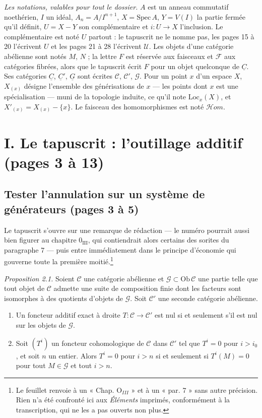 \documentclass[11pt,a4paper]{article}
\begin{document}
\emph{Les notations, valables pour tout le dossier.} $A$ est un anneau
commutatif noethérien, $I$ un idéal, $A_n = A/I^{n+1}$, $X = \mathrm{Spec}\, A$,
$Y = V(I)$ la partie fermée qu'il définit, $U = X - Y$ son complémentaire et
$i : U \to X$ l'inclusion. Le complémentaire est noté $U$ partout : le
tapuscrit ne le nomme pas, les pages 15 à 20 l'écrivent $U$ et les pages 21 à
28 l'écrivent $\mathcal{U}$. Les objets d'une catégorie abélienne sont notés
$M$, $N$ ; la lettre $F$ est réservée aux faisceaux et $\mathcal{F}$ aux
catégories fibrées, alors que le tapuscrit écrit $F$ pour un objet quelconque
de $\underline{C}$. Ses catégories $\underline{C}$, $\underline{C}'$,
$\underline{G}$ sont écrites $\mathcal{C}$, $\mathcal{C}'$, $\mathcal{G}$. Pour
un point $x$ d'un espace $X$, $X_{(x)}$ désigne l'ensemble des générisations de
$x$ — les points dont $x$ est une spécialisation — muni de la topologie
induite, ce qu'il note $\mathrm{Loc}_x(X)$, et $X'_{(x)} = X_{(x)} - \{x\}$. Le
faisceau des homomorphismes est noté $\mathcal{H}om$.

\section*{I. Le tapuscrit : l'outillage additif (pages 3 à 13)}

\subsection*{Tester l'annulation sur un système de générateurs (pages 3 à 5)}

Le tapuscrit s'ouvre sur une remarque de rédaction — le numéro pourrait aussi
bien figurer au chapitre $0_{\mathrm{III}}$, qui contiendrait alors certains des
sorites du paragraphe 7 — puis entre immédiatement dans le principe d'économie
qui gouverne toute la première moitié.\footnote{Le feuillet renvoie à un
« Chap. $\mathrm{O}_{III}$ » et à un « par. 7 » sans autre précision. Rien n'a
été confronté ici aux \emph{Éléments} imprimés, conformément à la
transcription, qui ne les a pas ouverts non plus.}

\emph{Proposition 2.1.} Soient $\mathcal{C}$ une catégorie abélienne et
$\mathcal{G} \subset \mathrm{Ob}\,\mathcal{C}$ une partie telle que tout objet
de $\mathcal{C}$ admette une suite de composition finie dont les facteurs sont
isomorphes à des quotients d'objets de $\mathcal{G}$. Soit $\mathcal{C}'$ une
seconde catégorie abélienne.

\begin{enumerate}
  \item[(i)] Un foncteur additif exact à droite $T : \mathcal{C} \to
  \mathcal{C}'$ est nul si et seulement s'il est nul sur les objets de
  $\mathcal{G}$.
  \item[(ii)] Soit $(T^{i})$ un foncteur cohomologique de $\mathcal{C}$ dans
  $\mathcal{C}'$ tel que $T^{i} = 0$ pour $i > i_{0}$, et soit $n$ un entier.
  Alors $T^{i} = 0$ pour $i > n$ si et seulement si $T^{i}(M) = 0$ pour tout
  $M \in \mathcal{G}$ et tout $i > n$.
\end{enumerate}
\end{document}
